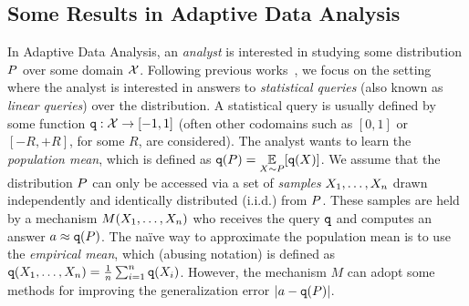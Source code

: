 \subsection{Some Results in Adaptive Data Analysis}
In Adaptive Data Analysis, an \emph{analyst} is interested in studying some distribution $P$ over some domain $\mathcal{X}$.  Following previous works~\cite{DworkFHPRR15,HardtU14,BassilyNSSSU16}, we focus on the setting where the analyst is interested in answers to \emph{statistical queries} (also known as \emph{linear queries}) over the distribution.  A statistical query is usually defined by some function ${\tt q} : \mathcal{X} \to [-1,1]$ (often other codomains such as $[0,1]$ or $[-R,+R]$, for some $R$, are considered).  The analyst wants to learn the \emph{population mean}, which is defined as 
$\qquery(\dist) = \ex{\sample \sim \dist}{\qquery(\sample)}$. 
%
We assume that the distribution $P$ can only be accessed via a set of \emph{samples} $X_1,\dots,X_n$ drawn independently and identically distributed (i.i.d.) from $P$.  These samples are held by a mechanism $M(X_1,\dots,X_n)$ who receives the query ${\tt q}$ and computes an answer 
$a \approx {\tt q}(P)$.
%
The na\"ive way to approximate the population mean is to use the \emph{empirical mean}, which (abusing notation) is defined as 
${\tt q}(X_1,\dots,X_n) = \frac{1}{n} \sum_{i=1}^{n} {\tt q}(X_i)$.
However, the mechanism $M$ can adopt some methods for improving the generalization error $| a- {\tt q}(P)|$.


